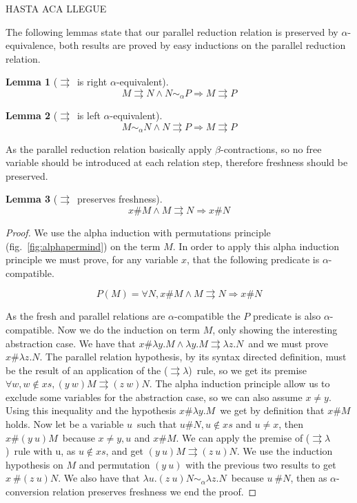 \documentclass[preprint,10pt]{sigplanconf}
\newcommand{\alp}{\ensuremath{\alpha}}
\newcommand{\lam}{\ensuremath{\lambda}}
\newcommand{\alpsym}{\ensuremath{\sim_\alpha}}
\newcommand{\p}{\ensuremath{\rightrightarrows}}
\newtheorem{lemma}{Lemma}
\begin{document}
HASTA ACA LLEGUE


The following lemmas state that our parallel reduction relation is preserved by \alp-equivalence, both results are proved by easy inductions on the parallel reduction relation.

\begin{lemma}[\p\ is right \alp-equivalent]
\label{prightalpha}
\[ M \p N \wedge N \alpsym P \Rightarrow M \p P \]
\end{lemma}

\begin{lemma}[\p\  is left \alp-equivalent]
\label{pleftalpha}
\[ M \alpsym N \wedge N \p P \Rightarrow M \p P \]
\end{lemma}

As the parallel reduction relation basically apply $\beta$-contractions, so no free variable should be introduced at each relation step, therefore freshness should be preserved. 

\begin{lemma}[\p\   preserves freshness]
\label{pfresh}
\[ x \# M \wedge M \p N  \Rightarrow x \# N \]
\end{lemma}

\begin{proof}
  We use the alpha induction with permutations principle (fig.~\ref{fig:alphapermind}) on the term $M$. In order to apply this alpha induction principle we must prove, for any variable $x$, that the following predicate is \alp-compatible.

\[ P(M) = \forall N, x \# M \wedge M \p N \Rightarrow x \# N \]

As the fresh and parallel relations are \alp-compatible the $P$ predicate is also \alp-compatible. Now we do the induction on term $M$, only showing the interesting abstraction case. We have that $x \# \lam y . M \wedge \lam y . M \p \lam z . N$\ and we must prove $x \# \lam z . N$.  The parallel relation hypothesis, by its syntax directed definition, must be the result of an application of the (\p\lam)\ rule, so we get its premise $\forall w, w \not\in xs, (y\ w) M \p (z\ w) N$. The alpha induction principle allow us to exclude some variables for the abstraction case, so we can also assume $ x\neq y$. Using this inequality and the hypothesis $x \# \lam y . M$\ we get by definition that $x\# M$ holds. Now let be a variable $u$\ such that $u \# N, u \not\in xs$ and $u \neq x$, then $x \# (y\ u) M$\ because $x \neq y,u$ and $x \# M$. We can apply the premise of (\p\lam)\ rule with u, as $u \not\in xs$, and get $(y\ u) M \p (z\ u) N$. We use the induction hypothesis on $M$ and permutation $(y\ u)$ with the previous two results to get $x\ \# (z\ u) N$. We also have that $\lam u .(z\ u)N \alpsym \lam z. N$\ because $u\ \# N$, then as \alp-conversion relation preserves freshness we end the proof.
\end{proof}
\end{document}
